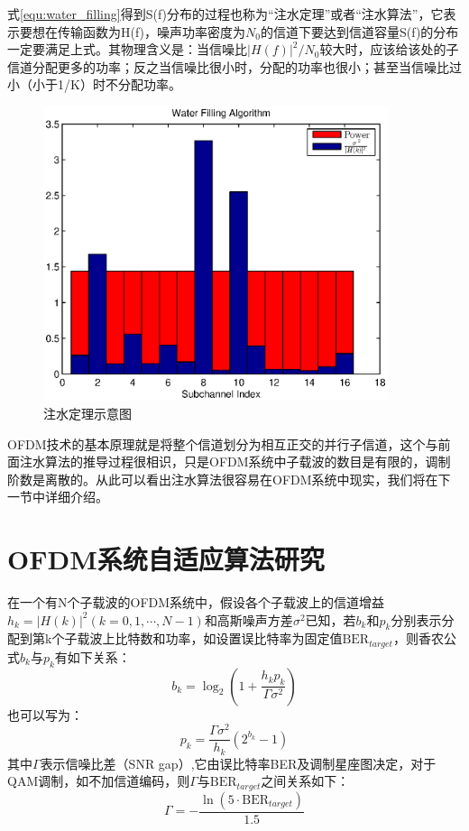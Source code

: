 式\ref{equ:water_filling}得到S(f)分布的过程也称为“注水定理”或者“注水算法”，它表示要想在传输函数为H(f)，噪声功率密度为$N_0$的信道下要达到信道容量S(f)的分布一定要满足上式。其物理含义是：当信噪比$|H(f)|^2/N_0$较大时，应该给该处的子信道分配更多的功率；反之当信噪比很小时，分配的功率也很小；甚至当信噪比过小（小于1/K）时不分配功率。
\begin{figure}[htbp]
\centering
\includegraphics[width=0.9\textwidth]{figures/chapter-4/waterFilling.eps}
\caption{注水定理示意图}
\label{fig:waterFilling}
\end{figure}
OFDM技术的基本原理就是将整个信道划分为相互正交的并行子信道，这个与前面注水算法的推导过程很相识，只是OFDM系统中子载波的数目是有限的，调制阶数是离散的。从此可以看出注水算法很容易在OFDM系统中现实，我们将在下一节中详细介绍。
\section{OFDM系统自适应算法研究}
在一个有N个子载波的OFDM系统中，假设各个子载波上的信道增益$h_k=|H(k)|^2(k=0,1,\cdots,N-1)$和高斯噪声方差$\sigma^2$已知，若$b_k$和$p_k$分别表示分配到第k个子载波上比特数和功率，如设置误比特率为固定值$\text{BER}_{target}$，则香农公式$b_k$与$p_k$有如下关系：
\begin{equation}
b_k = \log_2(1+\frac{h_kp_k}{\Gamma\sigma^2})
\end{equation}
也可以写为：
\begin{equation}
p_k = \frac{\Gamma\sigma^2}{h_k}(2^{b_k}-1)
\end{equation}
其中$\Gamma$表示信噪比差（SNR gap）,它由误比特率BER及调制星座图决定，对于QAM调制，如不加信道编码，则$\Gamma$与$\text{BER}_{target}$之间关系如下\cite{余官定2005ofdm}：
\begin{equation}
\Gamma = -\frac{\ln(5\cdot\text{BER}_{target})}{1.5}
\end{equation}

